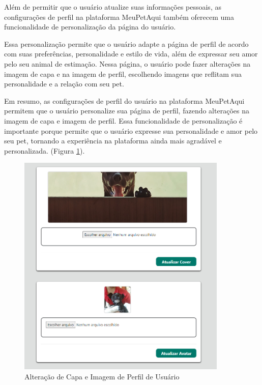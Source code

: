 Além de permitir que o usuário atualize suas informações pessoais, as configurações de perfil na plataforma MeuPetAqui também oferecem uma funcionalidade de personalização da página do usuário.

Essa personalização permite que o usuário adapte a página de perfil de acordo com suas preferências, personalidade e estilo de vida, além de expressar seu amor pelo seu animal de estimação. Nessa página, o usuário pode fazer alterações na imagem de capa e na imagem de perfil, escolhendo imagens que reflitam sua personalidade e a relação com seu pet.

Em resumo, as configurações de perfil do usuário na plataforma MeuPetAqui permitem que o usuário personalize sua página de perfil, fazendo alterações na imagem de capa e imagem de perfil. Essa funcionalidade de personalização é importante porque permite que o usuário expresse sua personalidade e amor pelo seu pet, tornando a experiência na plataforma ainda mais agradável e personalizada. (Figura \ref{fig:AltDeCapaImagemPerfilUsuário}).

\begin{figure}[htb]
     \centering
     \includegraphics[width=10cm]{arquivos/Figuras/image22.png}
     \caption{Alteração de Capa e Imagem de Perfil de Usuário}
     \label{fig:AltDeCapaImagemPerfilUsuário}
\end{figure}

